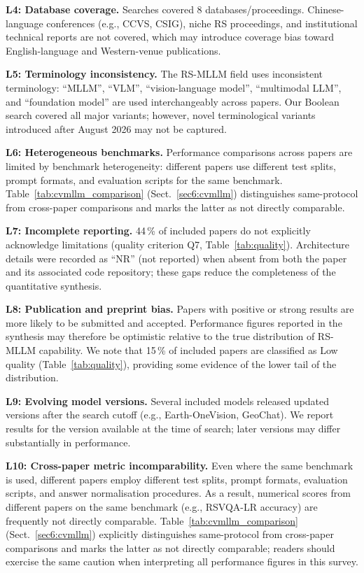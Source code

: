 \textbf{L4: Database coverage.} Searches covered 8 databases/proceedings.
Chinese-language conferences (e.g., CCVS, CSIG), niche RS proceedings,
and institutional technical reports are not covered, which may introduce
coverage bias toward English-language and Western-venue publications.

\textbf{L5: Terminology inconsistency.} The RS-MLLM field uses
inconsistent terminology: ``MLLM'', ``VLM'', ``vision-language model'',
``multimodal LLM'', and ``foundation model'' are used interchangeably
across papers. Our Boolean search covered all major variants; however,
novel terminological variants introduced after August 2026 may not be
captured.

\textbf{L6: Heterogeneous benchmarks.} Performance comparisons across
papers are limited by benchmark heterogeneity: different papers use
different test splits, prompt formats, and evaluation scripts for the
same benchmark. Table~\ref{tab:cvmllm_comparison} (Sect.~\ref{sec6:cvmllm})
distinguishes same-protocol from cross-paper comparisons and marks the
latter as not directly comparable.

\textbf{L7: Incomplete reporting.} 44\,\% of included papers do not
explicitly acknowledge limitations (quality criterion Q7, Table~\ref{tab:quality}).
Architecture details were recorded as ``NR'' (not reported) when absent
from both the paper and its associated code repository; these gaps
reduce the completeness of the quantitative synthesis.

\textbf{L8: Publication and preprint bias.} Papers with positive or
strong results are more likely to be submitted and accepted. Performance
figures reported in the synthesis may therefore be optimistic relative
to the true distribution of RS-MLLM capability. We note that 15\,\%
of included papers are classified as Low quality (Table~\ref{tab:quality}),
providing some evidence of the lower tail of the distribution.

\textbf{L9: Evolving model versions.} Several included models released
updated versions after the search cutoff (e.g., Earth-OneVision, GeoChat).
We report results for the version available at the time of search;
later versions may differ substantially in performance.

\textbf{L10: Cross-paper metric incomparability.} Even where the same
benchmark is used, different papers employ different test splits, prompt
formats, evaluation scripts, and answer normalisation procedures. As a
result, numerical scores from different papers on the same benchmark
(e.g., RSVQA-LR accuracy) are frequently not directly comparable.
Table~\ref{tab:cvmllm_comparison} (Sect.~\ref{sec6:cvmllm}) explicitly
distinguishes same-protocol from cross-paper comparisons and marks the
latter as not directly comparable; readers should exercise the same
caution when interpreting all performance figures in this survey.

